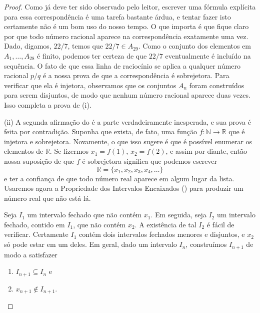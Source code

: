 \begin{proof}
Como já deve ter sido observado pelo leitor, escrever uma fórmula explícita para essa correspondência 
é uma tarefa bastante árdua, e tentar fazer isto certamente não é um bom uso do nosso tempo. 
O que importa é que fique claro por que todo número racional aparece na 
correspondência exatamente uma vez. 
Dado, digamos, $22/7$, temos que $22/7 \in A_{29}$. Como o conjunto dos 
elementos em $A_{1}, \dots, A_{28}$ é finito, podemos ter certeza de que $22/7$ 
eventualmente é incluído na sequência. O fato de que essa linha de raciocínio 
se aplica a qualquer número racional $p/q$ é a nossa prova de que a correspondência 
é sobrejetora. Para verificar que ela é injetora, observamos que os conjuntos 
$A_{n}$ foram construídos para serem disjuntos, de modo que nenhum número 
racional aparece duas vezes. Isso completa a prova de (i).

\bigskip 

(ii) A segunda afirmação do  é a parte verdadeiramente inesperada, e sua prova é feita por contradição. Suponha que exista, de fato, uma função $f \colon \mathbb{N} \to \mathbb{R}$ que é injetora e sobrejetora. Novamente, o que isso sugere é que é possível enumerar os elementos de $\mathbb{R}$. Se fizermos $x_{1} = f(1)$, $x_{2} = f(2)$, e assim por diante, então nossa suposição de que $f$ é sobrejetora significa que podemos escrever
\[
\mathbb{R} = \{x_{1}, x_{2}, x_{3}, x_{4}, \dots\} \tag{8}\label{eq:enumeracao-R}
\]
e ter a confiança de que todo número real aparece em algum lugar da lista. Usaremos agora a Propriedade dos Intervalos Encaixados () para produzir um número real que não está lá. 

Seja $I_{1}$ um intervalo fechado que não contém $x_{1}$. Em seguida, seja $I_{2}$ um intervalo fechado, contido em $I_{1}$, que não contém $x_{2}$. A existência de tal $I_{2}$ é fácil de verificar. Certamente $I_{1}$ contém dois intervalos fechados menores e disjuntos, e $x_{2}$ só pode estar em um deles. Em geral, dado um intervalo $I_{n}$, construímos $I_{n+1}$ de modo a satisfazer
\begin{enumerate}[label=\roman*)]
\item $I_{n+1} \subseteq I_{n}$ e
\item $x_{n+1} \notin I_{n+1}$.
\end{enumerate}
\vspace*{-1cm}
\begin{figure}[htbp]
  \centering
\end{figure}
\end{proof}

